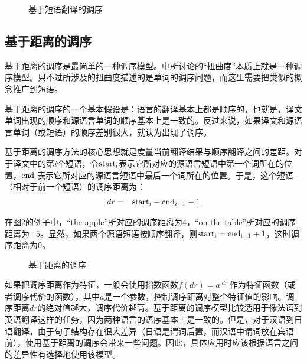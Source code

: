 \begin{figure}[htp]
\centering

\caption{基于短语翻译的调序}
\label{fig:7-16}
\end{figure}


\subsection{基于距离的调序}

\parinterval 基于距离的调序是最简单的一种调序模型。{\chaptersix}中所讨论的“扭曲度”本质上就是一种调序模型。只不过{\chaptersix}所涉及的扭曲度描述的是单词的调序问题，而这里需要把类似的概念推广到短语。

\parinterval 基于距离的调序的一个基本假设是：语言的翻译基本上都是顺序的，也就是，译文单词出现的顺序和源语言单词的顺序基本上是一致的。反过来说，如果译文和源语言单词（或短语）的顺序差别很大，就认为出现了调序。

\parinterval 基于距离的调序方法的核心思想就是度量当前翻译结果与顺序翻译之间的差距。对于译文中的第$i$个短语，令$\rm{start}_i$表示它所对应的源语言短语中第一个词所在的位置，$\rm{end}_i$表示它所对应的源语言短语中最后一个词所在的位置。于是，这个短语（相对于前一个短语）的调序距离为：
\begin{eqnarray}
dr & = & {\rm{start}}_i-{\rm{end}}_{i-1}-1
\label{eq:7-15}
\end{eqnarray}

\parinterval 在图\ref{fig:7-17}的例子中，“the apple”所对应的调序距离为4，“on the table”所对应的调序距离为$-5$。显然，如果两个源语短语按顺序翻译，则$\rm{start}_i = \rm{end}_{i-1} + 1$，这时调序距离为0。

\begin{figure}[htp]
\centering

\caption{基于距离的调序}
\label{fig:7-17}
\end{figure}

\parinterval 如果把调序距离作为特征，一般会使用指数函数$f(dr) = a^{|dr|}$作为特征函数（或者调序代价的函数），其中$a$是一个参数，控制调序距离对整个特征值的影响。调序距离$dr$的绝对值越大，调序代价越高。基于距离的调序模型比较适用于像法语到英语翻译这样的任务，因为两种语言的语序基本上是一致的。但是，对于汉语到日语翻译，由于句子结构存在很大差异（日语是谓词后置，而汉语中谓词放在宾语前），使用基于距离的调序会带来一些问题。因此，具体应用时应该根据语言之间的差异性有选择地使用该模型。

